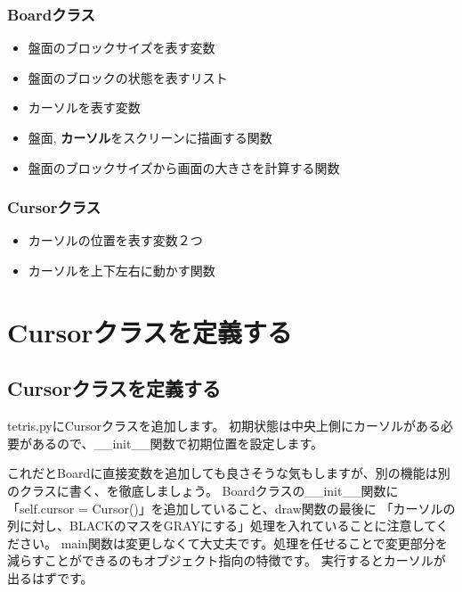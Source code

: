 \documentclass[12pt, a4paper, dvipdfmx]{book}
\begin{document}
\subsubsection{Boardクラス}
\begin{itemize}
  \item 盤面のブロックサイズを表す変数
  \item 盤面のブロックの状態を表すリスト
  \item カーソルを表す変数
  \item 盤面, \textbf{カーソル}をスクリーンに描画する関数
  \item 盤面のブロックサイズから画面の大きさを計算する関数
\end{itemize}

\subsubsection{Cursorクラス}
\begin{itemize}
  \item カーソルの位置を表す変数２つ
  \item カーソルを上下左右に動かす関数
\end{itemize}

\section{Cursorクラスを定義する}
\subsection{Cursorクラスを定義する}
tetris.pyにCursorクラスを追加します。
初期状態は中央上側にカーソルがある必要があるので、\_\_init\_\_関数で初期位置を設定します。

これだとBoardに直接変数を追加しても良さそうな気もしますが、別の機能は別のクラスに書く、を徹底しましょう。
Boardクラスの\_\_init\_\_関数に「self.cursor = Cursor()」を追加していること、draw関数の最後に
「カーソルの列に対し、BLACKのマスをGRAYにする」処理を入れていることに注意してください。
main関数は変更しなくて大丈夫です。処理を任せることで変更部分を減らすことができるのもオブジェクト指向の特徴です。
実行するとカーソルが出るはずです。
\end{document}
